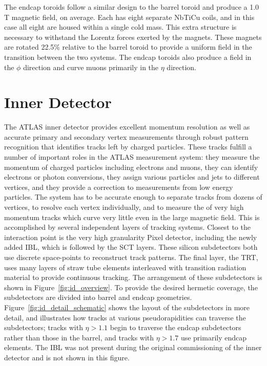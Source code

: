 The endcap toroids follow a similar design to the barrel toroid and produce a 1.0 T magnetic field, on average. 
Each has eight separate NbTiCu coils, and in this case all eight are housed within a single cold mass.
This extra structure is necessary to withstand the Lorentz forces exerted by the magnets. 
These magnets are rotated 22.5\% relative to the barrel toroid to provide a uniform field in the transition between the two systems. 
The endcap toroids also produce a field in the $\phi$ direction and curve muons primarily in the $\eta$ direction.


\section{Inner Detector}
\label{sec:inner_detector}

The \ac{ATLAS} inner detector provides excellent momentum resolution as well as accurate primary and secondary vertex measurements through robust pattern recognition that identifies tracks left by charged particles. 
These tracks fulfill a number of important roles in the \ac{ATLAS} measurement system: they measure the momentum of charged particles including electrons and muons, they can identify electrons or photon conversions, they assign various particles and jets to different vertices, and they provide a correction to \met measurements from low energy particles. 
The system has to be accurate enough to separate tracks from dozens of vertices, to resolve each vertex individually, and to measure the \pt of very high momentum tracks which curve very little even in the large magnetic field.
This is accomplished by several independent layers of tracking systems.
Closest to the interaction point is the very high granularity Pixel detector, including the newly added \acl{IBL}, which is followed by the \ac{SCT} layers.
These silicon subdetectors both use discrete space-points to reconstruct track patterns.
The final layer, the \ac{TRT}, uses many layers of straw tube elements interleaved with transition radiation material to provide continuous tracking.
The arrangement of these subdetectors is shown in Figure~\ref{fig:id_overview}.
To provide the desired hermetic coverage, the subdetectors are divided into barrel and endcap geometries.
Figure~\ref{fig:id_detail_schematic} shows the layout of the subdetectors in more detail, and illustrates how tracks at various pseudorapidities can traverse the subdetectors; tracks with $\eta > 1.1$ begin to traverse the endcap subdetectors rather than those in the barrel, and tracks with $\eta > 1.7$ use primarily endcap elements. 
The \ac{IBL} was not present during the original commissioning of the inner detector and is not shown in this figure.

